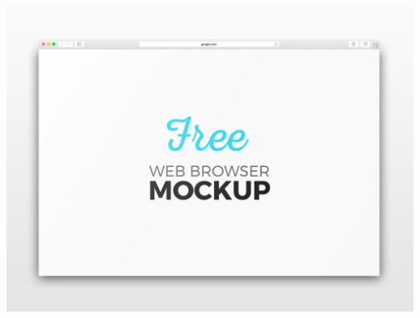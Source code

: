 \documentclass[a4paper]{article}
\begin{document}
              \begin{minipage}[c]{\textwidth}
          \centering
          \includegraphics[width=\textwidth]{src/issues/1 - EXAMPLE/issue.jpg}
          \label{1:EXAMPLE:issue.md:issue.jpg}
          \vspace{4ex}
        \end{minipage}
          
    \clearpage

    
\end{document}
